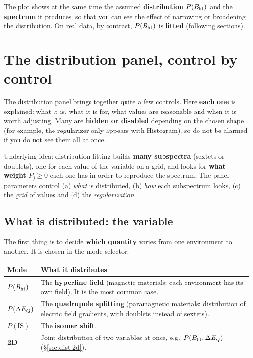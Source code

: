 The plot shows at the same time the assumed \textbf{distribution} $P(B_{\mathrm{hf}})$ and the
\textbf{spectrum} it produces, so that you can see the effect of narrowing or
broadening the distribution. On real data, by contrast, $P(B_{\mathrm{hf}})$ is
\textbf{fitted} (following sections).


\section{The distribution panel, control by control}
\label{sec:panel-dist}

The distribution panel brings together quite a few controls. Here \textbf{each
one} is explained: what it is, what it is for, what values are reasonable and when
it is worth adjusting. Many are \textbf{hidden or disabled} depending on the chosen
shape (for example, the regularizer only appears with Histogram), so do not be
alarmed if you do not see them all at once.

\begin{nota}
Underlying idea: distribution fitting builds \textbf{many subspectra} (sextets or
doublets), one for each value of the variable on a grid, and looks for \textbf{what
weight} $P_j\ge 0$ each one has in order to reproduce the spectrum. The panel
parameters control (a) \emph{what} is distributed, (b) \emph{how} each subspectrum
looks, (c) the \emph{grid} of values and (d) the \emph{regularization}.
\end{nota}

\subsection{What is distributed: the variable}
\label{sec:dist-variable}

The first thing is to decide \textbf{which quantity} varies from one environment to
another. It is chosen in the mode selector:

\begin{center}
\begin{tabular}{@{}lp{}@{}}
\toprule
\textbf{Mode} & \textbf{What it distributes} \\
\midrule
$P(B_{\mathrm{hf}})$ & The \textbf{hyperfine field} (magnetic materials: each environment has
its own field). It is the most common case. \\[3pt]
$P(\Delta E_{Q})$ & The \textbf{quadrupole splitting} (paramagnetic materials: distribution
of electric field gradients, with doublets instead of sextets). \\[3pt]
$P(\text{IS})$ & The \textbf{isomer shift}. \\[3pt]
\textbf{2D} & Joint distribution of two variables at once, e.g.\ $P(B_{\mathrm{hf}},\Delta E_{Q})$
(\S\ref{sec:dist-2d}). \\
\bottomrule
\end{tabular}
\end{center}

